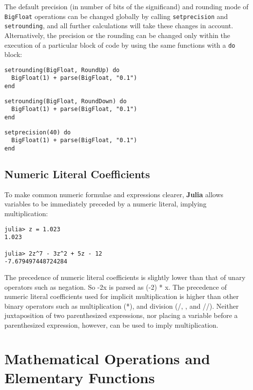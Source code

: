 \documentclass[
]{article}
\begin{document}
The default precision (in number of bits of the significand) and
rounding mode of \texttt{BigFloat} operations can be changed globally by
calling \texttt{setprecision} and \texttt{setrounding}, and all further
calculations will take these changes in account. Alternatively, the
precision or the rounding can be changed only within the execution of a
particular block of code by using the same functions with a \texttt{do}
block:

\begin{verbatim}
setrounding(BigFloat, RoundUp) do
  BigFloat(1) + parse(BigFloat, "0.1")
end
\end{verbatim}

\begin{verbatim}
setrounding(BigFloat, RoundDown) do
  BigFloat(1) + parse(BigFloat, "0.1")
end
\end{verbatim}

\begin{verbatim}
setprecision(40) do
  BigFloat(1) + parse(BigFloat, "0.1")
end
\end{verbatim}

\hypertarget{numeric-literal-coefficients}{%
\subsection{Numeric Literal
Coefficients}\label{numeric-literal-coefficients}}

To make common numeric formulae and expressions clearer, \textbf{Julia}
allows variables to be immediately preceded by a numeric literal,
implying multiplication:

\begin{verbatim}
julia> z = 1.023
1.023

julia> 2z^7 - 3z^2 + 5z - 12
-7.679497448724284
\end{verbatim}

The precedence of numeric literal coefficients is slightly lower than
that of unary operators such as negation. So -2x is parsed as (-2) * x.
The precedence of numeric literal coefficients used for implicit
multiplication is higher than other binary operators such as
multiplication (*), and division (/, , and //). Neither juxtaposition of
two parenthesized expressions, nor placing a variable before a
parenthesized expression, however, can be used to imply multiplication.

\newpage

\hypertarget{mathematical-operations-and-elementary-functions}{%
\section{Mathematical Operations and Elementary
Functions}\label{mathematical-operations-and-elementary-functions}}
\end{document}
